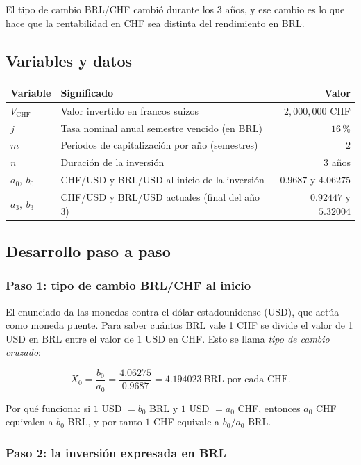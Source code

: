 \documentclass[11pt]{article}
\newcommand{\pc}{\text{\%}}
\begin{document}
El tipo de cambio BRL/CHF cambi\'o durante los 3 a\~nos, y ese cambio es lo que hace que la rentabilidad en CHF sea distinta del rendimiento en BRL.

\subsection{Variables y datos}

\begin{center}
\begin{tabular}{l l r}\toprule
Variable & Significado & Valor\\\midrule
$V_{\text{CHF}}$ & Valor invertido en francos suizos & $2{,}000{,}000$ CHF\\
$j$ & Tasa nominal anual semestre vencido (en BRL) & $16\,\pc$\\
$m$ & Periodos de capitalizaci\'on por a\~no (semestres) & $2$\\
$n$ & Duraci\'on de la inversi\'on & $3$ a\~nos\\
$a_0,\ b_0$ & CHF/USD y BRL/USD al inicio de la inversi\'on & $0.9687$ y $4.06275$\\
$a_3,\ b_3$ & CHF/USD y BRL/USD actuales (final del a\~no 3) & $0.92447$ y $5.32004$\\\bottomrule
\end{tabular}
\end{center}

\subsection{Desarrollo paso a paso}

\subsubsection*{Paso 1: tipo de cambio BRL/CHF al inicio}

El enunciado da las monedas contra el d\'olar estadounidense (USD), que act\'ua como moneda puente. Para saber cu\'antos BRL vale 1 CHF se divide el valor de 1 USD en BRL entre el valor de 1 USD en CHF. Esto se llama \emph{tipo de cambio cruzado}:

\[
X_0=\frac{b_0}{a_0}=\frac{4.06275}{0.9687}=4.194023\ \text{BRL por cada CHF.}
\]

Por qu\'e funciona: si $1$ USD $=b_0$ BRL y $1$ USD $=a_0$ CHF, entonces $a_0$ CHF equivalen a $b_0$ BRL, y por tanto $1$ CHF equivale a $b_0/a_0$ BRL.

\subsubsection*{Paso 2: la inversi\'on expresada en BRL}
\end{document}
